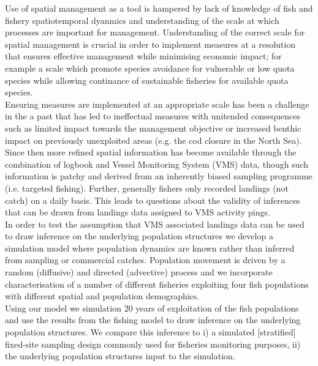 \documentclass[review]{elsarticle}
\begin{document}
Use of spatial management as a tool is hampered by lack of knowledge of fish
and fishery spatiotemporal dyanmics and understanding of the scale at which
processes are important for management. Understanding of the correct scale for
spatial management is crucial in order to implement measures at a resolution
that ensures effective management\cite{Dunn2016} while minimising economic
impact; for example a scale which promote species avoidance for vulnerable or
low quota species while allowing continance of sustainable fisheries for
available quota species. \\

Ensuring measures are implemented at an appropriate scale has been a challenge
in the a past that has led to ineffectual measures with unitended consequences
such as limited impact towards the management objective or increased benthic
impact on previously unexploited areas (e.g. the cod closure in the North
Sea\cite{Rijnsdorp2001,Dinmore2003}). Since then more refined spatial
information has become available through the combination of logbook and Vessel
Monitoring System (VMS) data\cite{Lee2010, Bastardie2010, Gerritsen2012,
	Mateo2016}, though such information is patchy and derived from an
inherently biased sampling programme (i.e. targeted fishing). Further,
generally fishers only recorded landings (not catch) on a daily basis. This
leads to questions about the validity of inferences that can be drawn from
landings data assigned to VMS activity pings. \\ 

In order to test the assumption that VMS associated landings data can be used
to draw inference on the underlying population structures we develop a
simulation model where population dynamics are known rather than inferred from
sampling or commercial catches. Population movement is driven by a random
(diffusive) and directed (advective) process and we incorporate
characterisation of a number of different fisheries exploiting four fish
populations with different spatial and population demographics.\\

Using our model we simulation 20 years of exploitation of the fish populations
and use the results from the fishing model to draw inference on the underlying
population structures.  We compare this inference to i) a simulated
[stratified] fixed-site sampling design commonly used for fisheries monitoring
purposes, ii) the underlying population structures input to the simulation.\\
\end{document}
